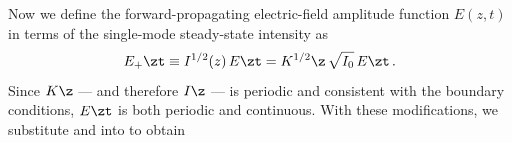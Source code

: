 Now we define the forward-propagating electric-field amplitude function $E(z,t)$ in terms of the single-mode steady-state intensity as
\begin{equation} \label{eqn:mflt_ezt_def}
    E_{+}\zt \equiv I^{1/2}(z)\, E\zt = K^{1/2}\z\, \sqrt{I_0}\, E\zt\, .
\end{equation}
Since $K\z$ --- and therefore $I\z$ --- is periodic and consistent with the boundary conditions, $E\zt$ is both periodic and continuous. With these modifications, we substitute  and  into  to obtain
